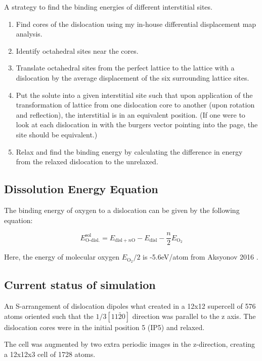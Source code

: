 \documentclass[11pt]{article}
\begin{document}
A strategy to find the binding energies of different interstitial
sites. 

\begin{enumerate}
\item Find cores of the dislocation using my in-house differential
displacement map analysis.
\item Identify octahedral sites near the cores.
\item Translate octahedral sites from the perfect lattice to the
lattice with a dislocation by the average displacement of the six
surrounding lattice sites.
\item Put the solute into a given interstitial site such that upon
application of the transformation of lattice from one
dislocation core to another (upon rotation and reflection), the
interstitial is in an equivalent position. (If one were to look
at each dislocation in with the burgers vector pointing into the
page, the site should be equivalent.)
\item Relax and find the binding energy by calculating the difference
in energy from the relaxed dislocation to the unrelaxed.
\end{enumerate}


\subsection{Dissolution Energy Equation}
\label{sec:org3033a7c}

The binding energy of oxygen to a dislocation can be given by the
following equation:

\[ E^{\text{sol}}_{\text{O-disl.}} = E_{\text{disl} + n\text{O}} -
   E_{\text{disl}} - \frac{n}{2} E_{\text{O}_2}   \]

Here, the energy of molecular oxygen \(E_{\text{O}_2}/2\) is -5.6eV/atom
from Aksyonov 2016 \cite{Aksyonov2016}. 



\subsection{Current status of simulation}
\label{sec:org5e82c3c}

An S-arrangement of dislocation dipoles what created in a 12x12
supercell of 576 atoms oriented such that the \(1/3[11\bar{2}0]\)
direction was parallel to the z axis. The dislocation cores were in
the initial position 5 (IP5) and relaxed.

The cell was augmented by two extra periodic images in the
z-direction, creating a 12x12x3 cell of 1728 atoms. 
\end{document}
